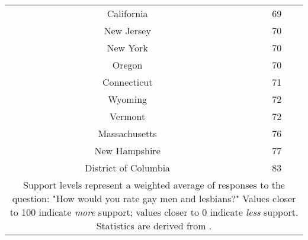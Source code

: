 \begin{spacing}{1}
\begin{longtable}{|c|c|}
California & 69\\
New Jersey & 70\\
New York & 70\\
Oregon & 70\\
Connecticut & 71\\
Wyoming & 72\\
Vermont & 72\\
Massachusetts & 76\\
New Hampshire & 77\\
District of Columbia & 83\\
\hline
\multicolumn{2}{p{0.8\linewidth}}{\footnotesize Support levels represent a weighted average of responses to the question: "How would you rate gay men and lesbians?" Values closer to 100 indicate \textit{more} support; values closer to 0 indicate \textit{less} support. Statistics are derived from \citet{29}.} \\ 
\end{longtable}
\end{spacing}
